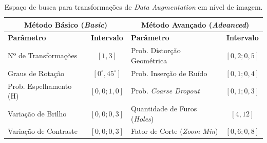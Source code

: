 \begin{table}[ht!]
    \centering
    \caption{Espaço de busca para transformações de \textit{Data Augmentation} em nível de imagem.}
    \label{tab:space_aug}
    \begin{tabular}{l c | l c}
        \toprule
        \multicolumn{2}{c|}{\textbf{Método Básico (\textit{Basic})}} & \multicolumn{2}{c}{\textbf{Método Avançado (\textit{Advanced})}} \\
        \midrule
        \textbf{Parâmetro} & \textbf{Intervalo} & \textbf{Parâmetro} & \textbf{Intervalo} \\
        \midrule
        Nº de Transformações & $[1, 3]$ & Prob. Distorção Geométrica & $[0,2; 0,5]$ \\
        Graus de Rotação & $[0^\circ, 45^\circ]$ & Prob. Inserção de Ruído & $[0,1; 0,4]$ \\
        Prob. Espelhamento (H) & $[0,0; 1,0]$ & Prob. \textit{Coarse Dropout} & $[0,1; 0,3]$ \\
        Variação de Brilho & $[0,0; 0,3]$ & Quantidade de Furos (\textit{Holes}) & $[4, 12]$ \\
        Variação de Contraste & $[0,0; 0,3]$ & Fator de Corte (\textit{Zoom Min}) & $[0,6; 0,8]$ \\
        \bottomrule
    \end{tabular}
\end{table}

\begin{table}[ht!]
    \centering
    \caption{Espaço de busca para agendadores de taxa de aprendizado (\textit{LR Schedulers}).}
    \label{tab:space_schedulers}
\end{table}